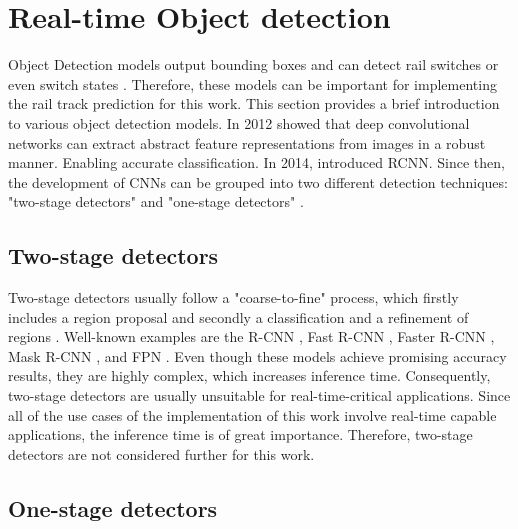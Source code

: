 \section{Real-time Object detection}
\label{sec:ObjectDetection}

Object Detection models output bounding boxes and can detect rail switches or even switch states \cite{railsem19dataset}.
Therefore, these models can be important for implementing the rail track prediction for this work.
This section provides a brief introduction to various object detection models.
In 2012 \cite{AlexNet2012} showed that deep convolutional networks can extract abstract feature representations from images in a robust manner.
Enabling accurate classification.
In 2014, \cite{RCNN2014} introduced \ac{RCNN}.
Since then, the development of \ac{CNN}s can be grouped into two different detection techniques: "two-stage detectors" and "one-stage detectors" \cite{20yearsSurvey, surveyObjectDetection, surveyObjectDetection2019}.

\vspace{0.5cm}

\subsection{Two-stage detectors}

Two-stage detectors usually follow a "coarse-to-fine" process, which firstly includes a region proposal and secondly a classification and a refinement of regions \cite{20yearsSurvey, surveyObjectDetection, surveyObjectDetection2019, twostageObjectDetection}.
Well-known examples are the R-CNN \cite{RCNN2014}, Fast R-CNN \cite{FastRCNN2015}, Faster R-CNN \cite{FasterRCNN2017}, Mask R-CNN \cite{MaskRCNN2017}, and \ac{FPN} \cite{FPN2017_two_stage-detector}.
Even though these models achieve promising accuracy results, they are highly complex, which increases inference time.
Consequently, two-stage detectors are usually unsuitable for real-time-critical applications.
Since all of the use cases of the implementation of this work involve real-time capable applications, the inference time is of great importance.
Therefore, two-stage detectors are not considered further for this work.

\vspace{0.5cm}

\subsection{One-stage detectors}

